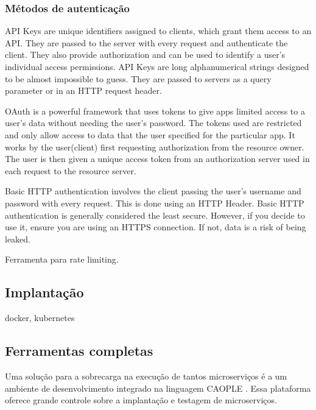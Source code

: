 \subsubsection{Métodos de autenticação}

API Keys are unique identifiers assigned to clients, which grant them access to an API. They are passed to the server with every request and authenticate the client. They also provide authorization and can be used to identify a user's individual access permissions. API Keys are long alphanumerical strings designed to be almost impossible to guess. They are passed to servers as a query parameter or in an HTTP request header.

OAuth is a powerful framework that uses tokens to give apps limited access to a user’s data without needing the user’s password. The tokens used are restricted and only allow access to data that the user specified for the particular app. It works by the user(client) first requesting authorization from the resource owner. The user is then given a unique access token from an authorization server used in each request to the resource server.

Basic HTTP authentication involves the client passing the user’s username and password with every request. This is done using an HTTP Header. Basic HTTP authentication is generally considered the least secure. However, if you decide to use it, ensure you are using an HTTPS connection. If not, data is a risk of being leaked.

Ferramenta para rate limiting. \cite{rapidAPI-twitter}

\subsection{Implantação}

docker, kubernetes

\subsection{Ferramentas completas}

Uma solução para a sobrecarga na execução de tantos microserviços é a um ambiente de desenvolvimento integrado na linguagem CAOPLE \cite{CAOPLE}. Essa plataforma oferece grande controle sobre a implantação e testagem de microserviços.